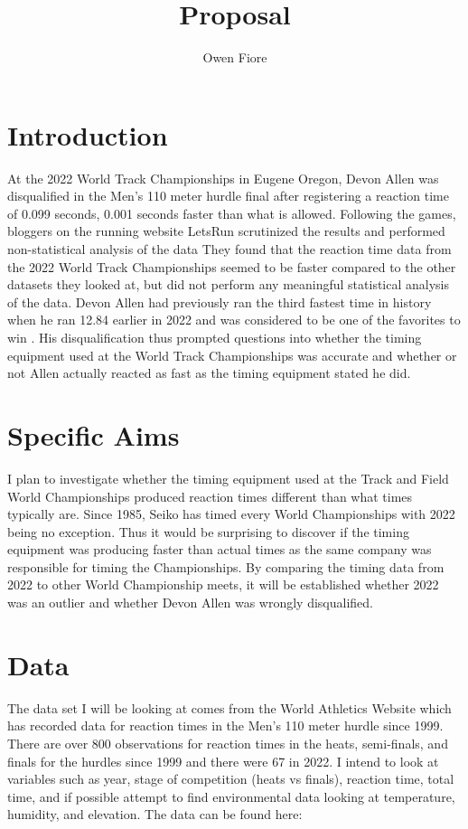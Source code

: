 \documentclass[12pt]{article}
\title{Proposal}
\author{
Owen Fiore
}
\begin{document}
\section{Introduction}

At the 2022 World Track Championships in Eugene Oregon, Devon Allen was disqualified in the
Men’s 110 meter hurdle final after registering a reaction time of 0.099 seconds, 0.001 
seconds faster than what is allowed.  Following the games, bloggers on the running website 
LetsRun scrutinized the results and performed non-statistical analysis of the data \citep{Johnson}
They found that the reaction time data from the 2022 World Track Championships seemed to be faster 
compared to the other datasets they looked at, but did not perform any meaningful statistical 
analysis of the data.  Devon Allen had previously ran the third fastest time in history when 
he ran 12.84 earlier in 2022 and was considered to be one of the favorites to win \citep{Preview}.  His 
disqualification thus prompted questions into whether the timing equipment used at the World
Track Championships was accurate and whether or not Allen actually reacted as fast as the 
timing equipment stated he did.

\section{Specific Aims}
I plan to investigate whether the timing equipment used at the Track and Field World Championships
 produced reaction times different than what times typically are.  Since 1985, Seiko has timed 
 every World Championships with 2022 being no exception\citep{Seiko}.  Thus it would be surprising to discover
 if the timing equipment was producing faster than actual times as the same company was responsible
 for timing the Championships.  By comparing the timing data from 2022 to other World Championship 
 meets, it will be established whether 2022 was an outlier and whether Devon Allen was wrongly 
 disqualified.

\section{Data}

The data set I will be looking at comes from the World Athletics Website which has recorded data
for reaction times in the Men’s 110 meter hurdle since 1999. There are over 800 observations for
reaction times in the heats, semi-finals, and finals for the hurdles since 1999 and there were
67 in 2022.  I intend to look at variables such as year, stage of competition (heats vs finals),
reaction time, total time, and if possible attempt to find environmental data looking at 
temperature, humidity, and elevation.  The data can be found here: \citet{WAData}
\end{document}
